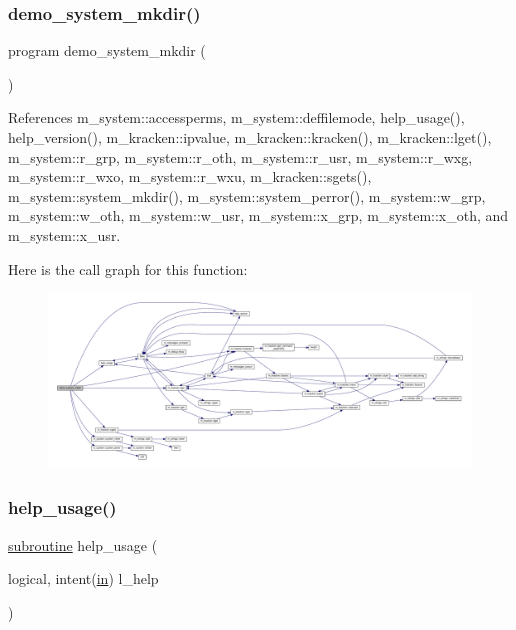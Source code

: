 \subsubsection{\texorpdfstring{demo\+\_\+system\+\_\+mkdir()}{demo\_system\_mkdir()}}
{\footnotesize\ttfamily program demo\+\_\+system\+\_\+mkdir (\begin{DoxyParamCaption}{ }\end{DoxyParamCaption})}



References m\+\_\+system\+::accessperms, m\+\_\+system\+::deffilemode, help\+\_\+usage(), help\+\_\+version(), m\+\_\+kracken\+::ipvalue, m\+\_\+kracken\+::kracken(), m\+\_\+kracken\+::lget(), m\+\_\+system\+::r\+\_\+grp, m\+\_\+system\+::r\+\_\+oth, m\+\_\+system\+::r\+\_\+usr, m\+\_\+system\+::r\+\_\+wxg, m\+\_\+system\+::r\+\_\+wxo, m\+\_\+system\+::r\+\_\+wxu, m\+\_\+kracken\+::sgets(), m\+\_\+system\+::system\+\_\+mkdir(), m\+\_\+system\+::system\+\_\+perror(), m\+\_\+system\+::w\+\_\+grp, m\+\_\+system\+::w\+\_\+oth, m\+\_\+system\+::w\+\_\+usr, m\+\_\+system\+::x\+\_\+grp, m\+\_\+system\+::x\+\_\+oth, and m\+\_\+system\+::x\+\_\+usr.

Here is the call graph for this function\+:
\nopagebreak
\begin{figure}[H]
\begin{center}
\leavevmode
\includegraphics[width=350pt]{__mkdir_8f90_a36a40ac20984c9e29c7629eea873fa77_cgraph}
\end{center}
\end{figure}
\mbox{\label{__mkdir_8f90_a3e09a3b52ee8fb04eeb93fe5761626a8}} 
\subsubsection{\texorpdfstring{help\+\_\+usage()}{help\_usage()}}
{\footnotesize\ttfamily \hyperlink{M__stopwatch_83_8txt_acfbcff50169d691ff02d4a123ed70482}{subroutine} help\+\_\+usage (\begin{DoxyParamCaption}\item[{logical, intent(\hyperlink{M__journal_83_8txt_afce72651d1eed785a2132bee863b2f38}{in})}]{l\+\_\+help }\end{DoxyParamCaption})}



